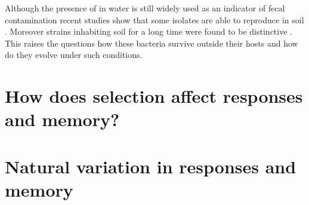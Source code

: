 


Although the presence of  in water is still widely used as an indicator of fecal contamination recent studies show that some  isolates are able to  reproduce in soil \cite{byappanahalli2004indigenous, somorin2016general}.
Moreover strains inhabiting soil for a long time were found to be distinctive \cite{walk2009cryptic, walk2015cryptic}.
This raises the questions how these bacteria survive outside their hosts and how do they evolve under such conditions.

\section{How does selection affect responses and memory?}

\section{Natural variation in responses and memory}


\cleardoublepage

